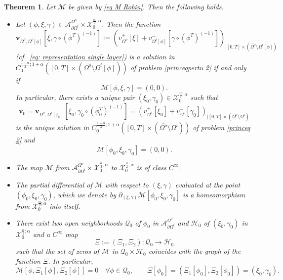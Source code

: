 \documentclass[10pt,a4paper]{amsart}
\newtheorem{theorem}{Theorem}
\begin{document}
\begin{theorem}\label{sec 4: thm recall}
Let $\mathcal{M}$ be given by \eqref{eq M Robin}. Then the following holds.
\begin{itemize}
    \item[(i)] Let $(\phi, \xi,\gamma) \in \mathcal{A}^{\Omega^o}_{\partial\Omega^i} \times \mathcal{X}_0^{\frac{\alpha}{2}; \alpha}$. Then the function
    \begin{equation*}
        \mathbf{v}_{\Omega^o,\Omega^i[\phi]}\left[\xi,\gamma \circ (\phi^T)^{(-1)} \right] := \left( v^+_{\Omega^o} [\xi] + v^-_{\Omega^i[\phi]} \left[\gamma\circ (\phi^T)^{(-1)}\right] \right)_{| [0,T] \times (\overline{\Omega^o} \setminus {\Omega^i[\phi]})}
    \end{equation*}
    (cf.\, \eqref{eq: representation single layer}) is a solution in $C_{0}^{\frac{1+\alpha}{2}; 1+\alpha}([0,T] \times (\overline{\Omega^o} \setminus \Omega^i[\phi]))$ of problem \eqref{princeqpertu 2} if and only if 
    \begin{equation*}
        \mathcal{M}[\phi,\xi,\gamma] = (0,0).
    \end{equation*}
    In particular, there exists a unique pair $(\xi_0,\gamma_0) \in \mathcal{X}_0^{\frac{\alpha}{2}; \alpha}$ such that 
    \[
    \mathbf{v}_0 =  \mathbf{v}_{\Omega^o,\Omega^i[\phi_0]}\left[\xi_0,\gamma_0 \circ (\phi_0^T)^{(-1)} \right] = \left( v^+_{\Omega^o} [\xi_0] + v^-_{\Omega^i} [\gamma_0] \right)_{| [0,T] \times (\overline{\Omega^o} \setminus {\Omega^i})}
    \]
    is the unique solution in $C_{0}^{\frac{1+\alpha}{2}; 1+\alpha}([0,T] \times (\overline{\Omega^o} \setminus \Omega^i))$ of problem \eqref{princeq 2} and 
    \[
    \mathcal{M}[\phi_0,\xi_0,\gamma_0] = (0,0).
    \]

    \item[(ii)] The map $\mathcal{M}$ from $\mathcal{A}^{\Omega^o}_{\partial\Omega^i} \times \mathcal{X}_0^{\frac{\alpha}{2}; \alpha}$ to $\mathcal{X}_0^{\frac{\alpha}{2}; \alpha}$ is of class $C^{\infty}$.

    \item[(iii)] The partial differential of $\mathcal{M}$ with respect to $(\xi,\gamma)$ evaluated at the point $(\phi_0,\xi_0,\gamma_0)$, which we denote by $\partial_{(\xi,\gamma)}\mathcal{M}[\phi_0,\xi_0,\gamma_0]$ is a homeomorphism from $\mathcal{X}_0^{\frac{\alpha}{2}; \alpha}$ into itself.

    \item[(iv)] There exist two open neighborhoods $\mathcal{Q}_0$ of $\phi_0$ in $\mathcal{A}^{\Omega^o}_{\partial\Omega^i}$ and $\mathcal{H}_0$ of $(\xi_0,\gamma_0)$ in $\mathcal{X}_0^{\frac{\alpha}{2}; \alpha}$ and a $C^{\infty}$ map 
    \[
    \Xi := (\Xi_1,\Xi_2): \mathcal{Q}_0 \to \mathcal{H}_0
    \]
    such that the set of zeros of $\mathcal{M}$ in $\mathcal{Q}_0 \times \mathcal{H}_0$ coincides with the graph of the function $\Xi$. In particular,
    \begin{equation*}
    \mathcal{M}[\phi, \Xi_1[\phi],\Xi_2[\phi]] = 0  \quad \forall\phi \in \mathcal{Q}_0, \qquad  \Xi[\phi_0]= (\Xi_1[\phi_0],\Xi_2[\phi_0])= (\xi_0,\gamma_0).
    \end{equation*}


\end{itemize}
\end{theorem}
\end{document}
